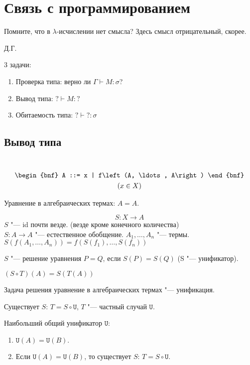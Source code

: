 \section{Связь с программированием}

\epigraph{Помните, что в $\lambda$-исчислении нет смысла? Здесь смысл отрицательный, скорее.}{Д.Г.}

3 задачи:
\begin{enumerate}[label=(\asbuk*)]
    \item Проверка типа: верно ли $\Gamma \vdash M : \sigma$?
    \item Вывод типа: $? \vdash M : ?$
    \item Обитаемость типа: $? \vdash ? : \sigma$
\end{enumerate}

\subsection{Вывод типа}

\begin{definition} \ \\
    \begin{gather*}
        \begin{bnf}
            A ::= x | f\left(A, \ldots, A\right)
        \end{bnf} \\
        (x \in X)
    \end{gather*}
\end{definition}

Уравнение в алгебраических термах: $A = A$.

\begin{definition}[$S$-подстановка]
    \[
        S : X \rightarrow A
    \]
    $S$ "--- id почти везде. (везде кроме конечного количества) \\
    $S : A \rightarrow A$ "--- естественное обобщение. $A_1, \ldots, A_n$ "--- термы.
    $S\left(f\left(A_1, \dots, A_n\right)\right) = f\left(S(f_1), \ldots, S(f_n)\right)$
\end{definition}

\begin{definition}
    $S$ "--- решение уравнения $P=Q$, если $S(P)=S(Q)$ (S "--- унификатор).
\end{definition}
\begin{definition}
    $(S \circ T)(A) = S(T(A))$
\end{definition}
Задача решения уравнение в алгебраических термах "--- унификация.
\begin{definition}
    Существует $S$: $T = S \circ \texttt{U}$, $T$ "--- частный случай $\texttt{U}$.
\end{definition}
\begin{definition}
    Наибольший общий унификатор $\texttt{U}$:
    \begin{enumerate}
        \item $\texttt{U}(A)=\texttt{U}(B)$.
        \item Если $\texttt{U}(A)=\texttt{U}(B)$, то существует $S$: $T = S \circ \texttt{U}$.
    \end{enumerate}
\end{definition}

